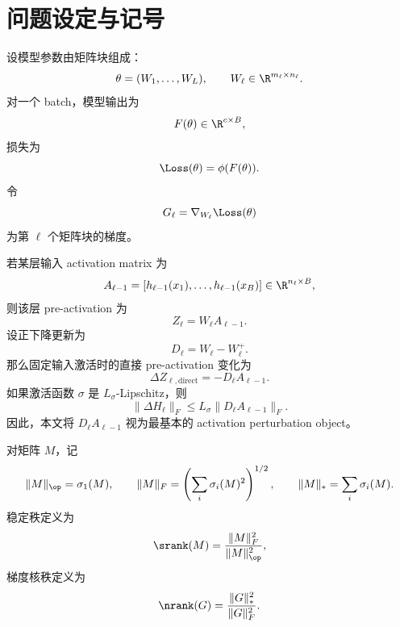 \section{问题设定与记号}

设模型参数由矩阵块组成：
\[
\theta=(W_1,\ldots,W_L),\qquad W_\ell\in\R^{m_\ell\times n_\ell}.
\]
对一个 batch，模型输出为
\[
F(\theta)\in\R^{c\times B},
\]
损失为
\[
\Loss(\theta)=\phi(F(\theta)).
\]
令
\[
G_\ell=\nabla_{W_\ell}\Loss(\theta)
\]
为第 \(\ell\) 个矩阵块的梯度。

若某层输入 activation matrix 为
\[
A_{\ell-1}=[h_{\ell-1}(x_1),\ldots,h_{\ell-1}(x_B)]\in\R^{n_\ell\times B},
\]
则该层 pre-activation 为
\[
Z_\ell=W_\ell A_{\ell-1}.
\]
设正下降更新为
\[
D_\ell=W_\ell-W_\ell^+.
\]
那么固定输入激活时的直接 pre-activation 变化为
\[
\Delta Z_{\ell,\mathrm{direct}}=-D_\ell A_{\ell-1}.
\]
如果激活函数 \(\sigma\) 是 \(L_\sigma\)-Lipschitz，则
\[
\|\Delta H_\ell\|_F
\le
L_\sigma\|D_\ell A_{\ell-1}\|_F.
\]
因此，本文将 \(D_\ell A_{\ell-1}\) 视为最基本的 activation perturbation object。

对矩阵 \(M\)，记
\[
\|M\|_{\op}=\sigma_1(M),\qquad
\|M\|_F=\left(\sum_i\sigma_i(M)^2\right)^{1/2},
\qquad
\|M\|_*=\sum_i\sigma_i(M).
\]
稳定秩定义为
\[
\srank(M)=\frac{\|M\|_F^2}{\|M\|_{\op}^2},
\]
梯度核秩定义为
\[
\nrank(G)=\frac{\|G\|_*^2}{\|G\|_F^2}.
\]

